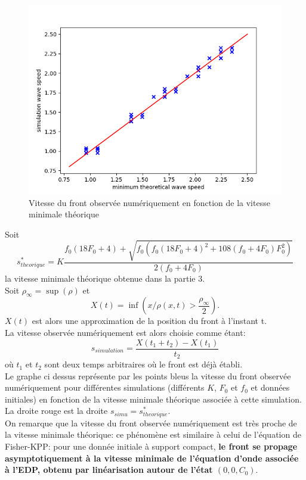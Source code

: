 \documentclass[11pt]{article}
\begin{document}
\newpage
 
\begin{figure}[hbt!]
\centering
\includegraphics[width=.7\textwidth]{Images/stheoriquevssimulations.png}
\caption{Vitesse du front observée numériquement en fonction de la vitesse minimale théorique}
\end{figure}
Soit \begin{equation}
s^*_{theorique} =K\frac{f_0(18F_0+4)+\sqrt{f_0(f_0(18F_0+4)^2+108(f_0+4F_0)F_0^2)}}{2(f_0+4F_0)}\end{equation} la vitesse minimale théorique obtenue dans la partie 3.\\
Soit $\rho_\infty =\sup(\rho)$ et \begin{equation}
	 X(t)=\inf(x / \rho(x,t)> \frac{\rho_\infty}{2}). 
\end{equation}
$X(t)$ est alors une approximation de la position du front à l'instant t.\\
 La vitesse observée numériquement est alors choisie comme étant: \begin{equation}
	s_{simulation}=\frac{X(t_1+t_2)-X(t_1)}{t_2}
\end{equation}	où $t_1$ et $t_2$ sont deux temps arbitraires où le front est déjà établi.\\
Le graphe ci dessus représente par les points bleus la vitesse du front observée numériquement pour différentes simulations (différents $K$, $F_0$ et $f_0$ et données initiales) en fonction de la vitesse minimale théorique associée à cette simulation. La droite rouge est la droite $s_{simu} = s^*_{theorique}$.\\
On remarque que la vitesse du front observée numériquement est très proche de la vitesse minimale théorique: ce phénomène est similaire à celui de l'équation de Fisher-KPP: pour une donnée initiale à support compact, \textbf{le front se propage asymptotiquement à la vitesse minimale de l'équation d'onde associée à l'EDP, obtenu par linéarisation autour de l'état $(0,0,C_0)$}.
\end{document}
